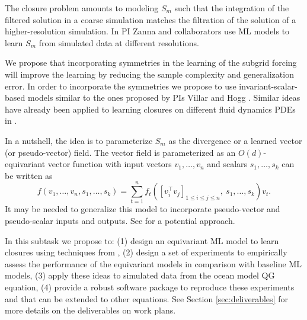 \documentclass[11pt]{article}
\begin{document}
The closure problem amounts to modeling $S_m$ such that the integration of the filtered solution in a coarse simulation matches the filtration of the solution of a higher-resolution simulation. In \cite{perezhogin2023generative} PI Zanna and collaborators use ML models to learn $S_m$ from simulated data at different resolutions. 

We propose that incorporating symmetries in the learning of the subgrid forcing will improve the learning by reducing the sample complexity and generalization error. In order to incorporate the symmetries we propose to use invariant-scalar-based models similar to the ones proposed by PIs Villar and Hogg \cite{villar2021scalars}. Similar ideas have already been applied to learning closures on different fluid dynamics PDEs in \cite{xu2022pde}.

In a nutshell, the idea is to parameterize $S_m$ as the divergence or a learned vector (or pseudo-vector) field. The vector field is parameterized as an $O(d)$-equivariant vector function with input vectors $v_1,\ldots, v_n$ and scalars $s_1,\ldots, s_k$ can be written as 
$$f(v_1,\ldots, v_n, s_1,\ldots, s_k) = \sum_{t=1}^n f_t([v_i^\top v_j]_{1\leq i \leq j \leq n },\ s_1, \ldots, s_k)v_t.$$
It may be needed to generalize this model to incorporate pseudo-vector and pseudo-scalar inputs and outputs. See \cite{gregory2023geometricimagenet} for a potential approach.

In this subtask we propose to:
(1) design an equivariant ML model to learn closures using techniques from \cite{villar2021scalars, xu2022pde}, (2) design a set of experiments to empirically assess the performance of the equivariant models in comparison with baseline ML models, (3) apply these ideas to simulated data from the ocean model QG equation, (4) provide a robust software package to reproduce these experiments and that can be extended to other equations.
See Section \ref{sec:deliverables} for more details on the deliverables on work plans. 

\end{document}
